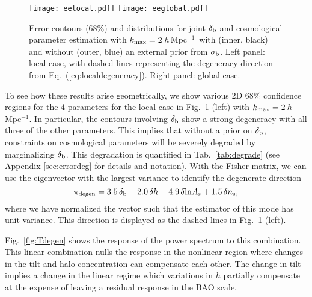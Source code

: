 \documentclass[prd,twocolumn,amsmath,amssymb,floatfix,superscriptaddress]{revtex4-1}
\newcommand{\lnAs}{{\ln\!A_\textrm{s}}}
\newcommand{\ns}{{n_\textrm{s}}}
\newcommand{\br}{{\rm b}}
\newcommand{\hMpci}{$h\,$Mpc$^{-1}$}
\begin{document}
{{\begin{figure*}[htbp]
    \centering
    \texttt{[image: eelocal.pdf]}
    \texttt{[image: eeglobal.pdf]}
    \caption{
        \footnotesize Error contours (68\%) and distributions for joint $\delta_\br$ and
        cosmological parameter estimation with $k_{\rm max}=2\,$\hMpci\ with (inner, black) and without (outer, blue) an external prior from $\sigma_\br$.  Left panel: local case,
        with dashed lines representing the degeneracy direction from Eq.~(\ref{eq:localdegeneracy}).
        Right panel: global case.  
}
    \label{fig:ee}
\end{figure*}

To see how these results arise geometrically,
 we show various 2D 68\% confidence regions for the 4 parameters for the local case 
    in Fig.~\ref{fig:ee} (left) with $k_{\rm max}=2\,$\hMpci.   In particular, the contours
{involving}
$\delta_\br$ show a strong degeneracy with all three of the other parameters.
This implies that without a prior on $\delta_\br$, constraints on cosmological parameters
will be severely degraded by marginalizing $\delta_\br$.
This degradation is quantified in Tab.~\ref{tab:degrade} (see Appendix \ref{sec:errordeg}
for details and notation).
With the Fisher matrix, we can use the eigenvector with the  largest
variance
 to identify
the degenerate direction 
\begin{equation}
    \pi_{\rm degen} = 3.5\,\delta_\br + 2.0\,\delta h - 4.9\,\delta\lnAs + 1.5\,\delta\ns,
    \label{eq:localdegeneracy}
\end{equation}
where we have normalized the vector
such that the estimator of this mode has unit variance.
This direction is displayed as the dashed lines in Fig.~\ref{fig:ee} (left).  

Fig.~\ref{fig:Tdegen} shows the response of the power spectrum to this combination.
This linear combination nulls the response in the nonlinear region where changes in the tilt
and {halo} concentration can compensate each other.  The change in tilt implies a
change in the linear regime which variations in $h$ partially compensate 
 at the expense of leaving a residual response in the
BAO scale.  



}}
\end{document}
